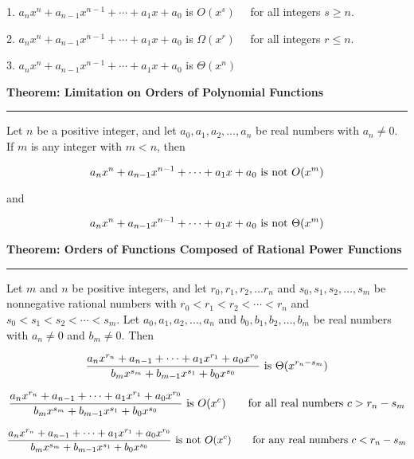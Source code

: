 \vskip 1mm
1. $a_nx^n+a_{n-1}x^{n-1}+\cdots+a_1x+a_0$ is $O(x^s)\quad$ for all integers $s\geq n$.

\vskip 3mm
2. $a_nx^n+a_{n-1}x^{n-1}+\cdots+a_1x+a_0$ is $\Omega(x^r)\quad$ for all integers $r\leq n$.

\vskip 3mm
3. $a_nx^n+a_{n-1}x^{n-1}+\cdots+a_1x+a_0$ is $\Theta(x^n)$

\filbreak
\vskip 1cm
{\bf Theorem: Limitation on Orders of Polynomial Functions}
\vskip 1mm
\hrule

\vskip 1mm
Let $n$ be a positive integer, and let $a_0,a_1,a_2,\ldots,a_n$ be real numbers with $a_n\neq 0$. If $m$ is any integer with $m<n$, then

$$a_nx^n+a_{n-1}x^{n-1}+\cdots+a_1x+a_0\hbox{ is not } O(x^m)$$

and

$$a_nx^n+a_{n-1}x^{n-1}+\cdots+a_1x+a_0\hbox{ is not } \Theta(x^m)$$

\filbreak
\vskip 1cm
{\bf Theorem: Orders of Functions Composed of Rational Power Functions}
\vskip 1mm
\hrule

\vskip 1mm
Let $m$ and $n$ be positive integers, and let $r_0,r_1,r_2,\ldots r_n$ and $s_0,s_1,s_2,\ldots,s_m$ be nonnegative rational numbers with $r_0<r_1<r_2<\cdots<r_n$ and $s_0<s_1<s_2<\cdots<s_m$. Let $a_0, a_1,a_2,\ldots,a_n$ and $b_0,b_1,b_2,\ldots,b_m$ be real numbers with $a_n\neq 0$ and $b_m\neq 0$. Then

$${a_nx^{r_n}+a_{n-1}+\cdots+a_1x^{r_1}+a_0x^{r_0}\over b_mx^{s_m}+b_{m-1}x^{s_1}+b_0x^{s_0}}\hbox{ is } \Theta(x^{r_n-s_m})$$

$${a_nx^{r_n}+a_{n-1}+\cdots+a_1x^{r_1}+a_0x^{r_0}\over b_mx^{s_m}+b_{m-1}x^{s_1}+b_0x^{s_0}}\hbox{ is } O(x^c)\qquad\hbox{for all real numbers $c>r_n-s_m$}$$

$${a_nx^{r_n}+a_{n-1}+\cdots+a_1x^{r_1}+a_0x^{r_0}\over b_mx^{s_m}+b_{m-1}x^{s_1}+b_0x^{s_0}}\hbox{ is not } O(x^c)\qquad\hbox{for any real numbers $c<r_n-s_m$}$$



\filbreak
\vfill\eject
\bye
